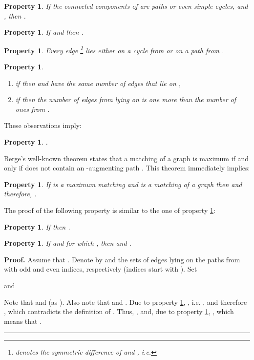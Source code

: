 \documentclass[a4paper, 12pt]{article}
\newtheorem{property}[definition]{Property}
\newenvironment{proof}[1][Proof]{\noindent\textbf{#1.} }{\ \rule{0.5em}{0.5em}}
\begin{document}
\begin{property}\label{path_evencycle_HH'}
If the connected components of  are paths or even simple cycles,
and \\ , then .
\end{property}

\begin{property}\label{altpathequaldegrees}
If  and  then .
\end{property}

\begin{property}\label{edge_lies_on_alt_component}
Every edge  \footnote{ denotes
the symmetric difference of  and , i.e. } lies either on a cycle from
 or on a path from .
\end{property}

\begin{property}\label{AB}\
\renewcommand{\labelenumi}{(\arabic{enumi})}
\begin{enumerate}
\item if  then  and  have the same number of edges that
lie on ,

\item if  then the number of edges from  lying on  is one more than the number of ones from .
\end{enumerate}
\end{property}

These observations imply:

\begin{property}\label{cardinalitydiff}
.
\end{property}

Berge's well-known theorem states that a matching  of a graph 
is maximum if and only if  does not contain an -augmenting
path \cite{Har, Lov-Plum, West}. This theorem immediately implies:

\begin{property}
\label{maxmatchingproperty} If  is a maximum matching and  is
a matching of a graph  then
and therefore, .
\end{property}

The proof of the following property is similar to the one of
property \ref{maxmatchingproperty}:

\begin{property} \label{HH'}
If  then .
\end{property}

\begin{property} \label{lambda=2alpha}
If  and  for which , then  and .
\end{property}
\begin{proof}
Assume that . Denote by  and  the
sets of edges lying on the paths from  with odd and even
indices, respectively (indices start with ). Set

and

Note that  and  (as ). Also note that
 and . Due to property \ref{cardinalitydiff}, , i.e. ,
and therefore , which
contradicts the definition of . Thus, , and, due to property \ref{cardinalitydiff}, , which means that .
\end{proof}
\end{document}
